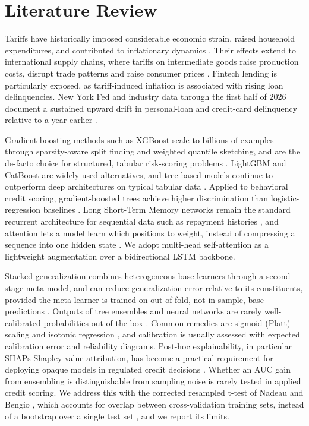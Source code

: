 \documentclass[conference,a4paper]{IEEEtran}
\begin{document}
\section{Literature Review}

Tariffs have historically imposed considerable economic strain, raised household expenditures, and contributed to inflationary dynamics \cite{r14}. Their effects extend to international supply chains, where tariffs on intermediate goods raise production costs, disrupt trade patterns and raise consumer prices \cite{r15}. Fintech lending is particularly exposed, as tariff-induced inflation is associated with rising loan delinquencies. New York Fed and industry data through the first half of 2026 document a sustained upward drift in personal-loan and credit-card delinquency relative to a year earlier \cite{r10,r11,r12}.

Gradient boosting methods such as XGBoost scale to billions of examples through sparsity-aware split finding and weighted quantile sketching, and are the de-facto choice for structured, tabular risk-scoring problems \cite{r2}. LightGBM \cite{r23} and CatBoost \cite{r24} are widely used alternatives, and tree-based models continue to outperform deep architectures on typical tabular data \cite{r30}. Applied to behavioral credit scoring, gradient-boosted trees achieve higher discrimination than logistic-regression baselines \cite{r7}. Long Short-Term Memory networks remain the standard recurrent architecture for sequential data such as repayment histories \cite{r1}, and attention lets a model learn which positions to weight, instead of compressing a sequence into one hidden state \cite{r3}. We adopt multi-head self-attention as a lightweight augmentation over a bidirectional LSTM backbone.

Stacked generalization combines heterogeneous base learners through a second-stage meta-model, and can reduce generalization error relative to its constituents, provided the meta-learner is trained on out-of-fold, not in-sample, base predictions \cite{r5}. Outputs of tree ensembles and neural networks are rarely well-calibrated probabilities out of the box \cite{r28,r32}. Common remedies are sigmoid (Platt) scaling \cite{r26} and isotonic regression \cite{r27}, and calibration is usually assessed with expected calibration error \cite{r29} and reliability diagrams. Post-hoc explainability, in particular SHAP\textquotesingle s Shapley-value attribution, has become a practical requirement for deploying opaque models in regulated credit decisions \cite{r4}. Whether an AUC gain from ensembling is distinguishable from sampling noise is rarely tested in applied credit scoring. We address this with the corrected resampled t-test of Nadeau and Bengio \cite{r25}, which accounts for overlap between cross-validation training sets, instead of a bootstrap over a single test set \cite{r18}, and we report its limits.
\end{document}
